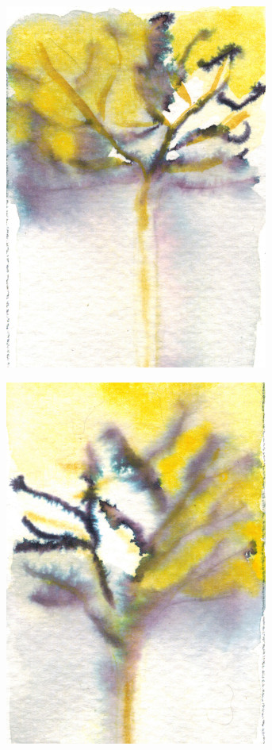 \begin{titlepage}

\begin{minipage}{0.5\textwidth}
\begin{center}
\includegraphics[scale=0.4]{./presentation/gauche}
\end{center}
\end{minipage}
\hfill
\begin{minipage}{0.4\textwidth}
\begin{center}
\includegraphics[scale=0.4]{./presentation/droite}
\end{center}
\end{minipage}
\textsc{\Large }\\[0.5cm]


\end{titlepage}
